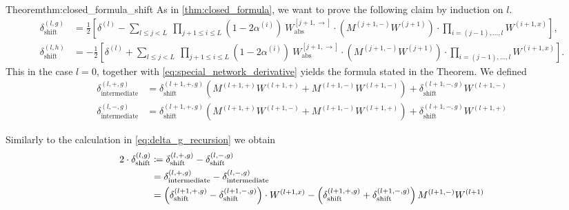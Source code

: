 \begin{proofref}{Theorem}{thm:closed_formula_shift}
    As in \cref{thm:closed_formula}, we want to prove the following claim by induction on $l$.
   \begin{align}
        \delta_{\text{shift}}^{(l, g)}
            &= \frac{1}{2} \left[ \delta^{(l)}- \sum_{l \leq j < L} \ \prod_{j+1 \leq i \leq L} \left( 1 - 2\alpha^{(i)} \right) \ W_{\text{abs}}^{[j+1, \rightarrow]} \cdot \left( M^{(j+1,-)}W^{(j+1)} \right) \cdot \prod_{i = (j-1),\dots, l} W^{(i+1, x)} \right], \\
        \delta_{\text{shift}}^{(l, h)}
            &= -\frac{1}{2} \left[ \delta^{(l)} + \sum_{l \leq j < L} \ \prod_{j+1 \leq i \leq L} \left( 1 - 2\alpha^{(i)} \right) \ W_{\text{abs}}^{[j+1, \rightarrow]} \cdot \left( M^{(j+1,-)}W^{(j+1)} \right) \cdot \prod_{i = (j-1),\dots, l} W^{(i+1, x)} \right].
    \end{align}
    This in the case $l=0$, together with \cref{eq:special_network_derivative} yields the formula stated in the Theorem.
    We defined
    \begin{align}
        \delta_{\text{intermediate}}^{(l,+,g)}
            &= \delta_{\text{shift}}^{(l+1,+,g)} \left( M^{(l+1, +)} W^{(l+1, +)} + M^{(l+1, -)} W^{(l+1, -)} \right)
                + \delta_{\text{shift}}^{(l+1,-,g)} W^{(l+1, -)} \label{eq:delta_shift_pos_g} \\
        \delta_{\text{intermediate}}^{(l,-,g)}
            &= \delta_{\text{shift}}^{(l+1,+,g)} \left(M^{(l+1, +)} W^{(l+1, -)} + M^{(l+1, -)} W^{(l+1, +)} \right)
                + \delta_{\text{shift}}^{(l+1,-,g)} W^{(l+1, +)} \label{eq:delta_shift_neg_g}
    \end{align}
    
    Similarly to the calculation in \cref{eq:delta_g_recursion} we obtain
    \begin{align}
        2 \cdot \delta_{\text{shift}}^{(l,g)}
            &\coloneqq \delta_{\text{shift}}^{(l,+,g)} - \delta_{\text{shift}}^{(l,-,g)} \notag\\
            &= \delta_{\text{intermediate}}^{(l,+,g)} - \delta_{\text{intermediate}}^{(l,-,g)} \notag\\
            &= \left( \delta_{\text{shift}}^{(l+1,+,g)} - \delta_{\text{shift}}^{(l+1,-,g)} \right) \cdot W^{(l+1, x)}
                - \left( \delta_{\text{shift}}^{(l+1,+,g)} + \delta_{\text{shift}}^{(l+1,-,g)} \right) M^{(l+1, -)} W^{(l+1)} \label{eq:delta_g_shif}
    \end{align}
    

\end{proofref}
